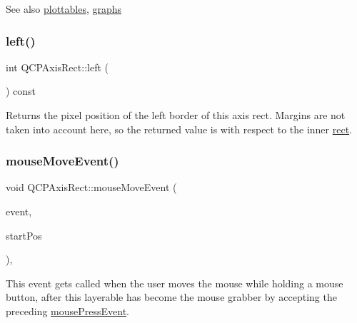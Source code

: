 \begin{DoxySeeAlso}{See also}
\hyperlink{class_q_c_p_axis_rect_a587d073a97b27bc7293fab4b2774ad59}{plottables}, \hyperlink{class_q_c_p_axis_rect_a2d9ded3eca97be1fcb5867949391bb88}{graphs} 
\end{DoxySeeAlso}
\mbox{\label{class_q_c_p_axis_rect_afb4a3de02046b20b9310bdb8fca781c3}} 
\subsubsection{\texorpdfstring{left()}{left()}}
{\footnotesize\ttfamily int Q\+C\+P\+Axis\+Rect\+::left (\begin{DoxyParamCaption}{ }\end{DoxyParamCaption}) const\hspace{0.3cm}{\ttfamily [inline]}}

Returns the pixel position of the left border of this axis rect. Margins are not taken into account here, so the returned value is with respect to the inner \hyperlink{class_q_c_p_layout_element_a208effccfe2cca4a0eaf9393e60f2dd4}{rect}. \mbox{\label{class_q_c_p_axis_rect_a9cd27ad8c5cfb49aefd9dbb30def4beb}} 
\subsubsection{\texorpdfstring{mouse\+Move\+Event()}{mouseMoveEvent()}}
{\footnotesize\ttfamily void Q\+C\+P\+Axis\+Rect\+::mouse\+Move\+Event (\begin{DoxyParamCaption}\item[{Q\+Mouse\+Event $\ast$}]{event,  }\item[{const Q\+PointF \&}]{start\+Pos }\end{DoxyParamCaption})\hspace{0.3cm}{\ttfamily [protected]}, {\ttfamily [virtual]}}

This event gets called when the user moves the mouse while holding a mouse button, after this layerable has become the mouse grabber by accepting the preceding \hyperlink{class_q_c_p_axis_rect_aa9a7c807eaa4666870ac94aa6abc4dde}{mouse\+Press\+Event}.

